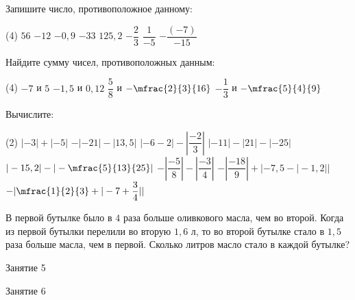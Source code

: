 \begin{homework}[number=2]
	\begin{listofex}
		\item Запишите число, противоположное данному:
		\begin{tasks}(4)
			\task \( 56  \)
			\task \( -12 \)
			\task \( -0,9 \)
			\task \( -33 \)
			\task \( 125,2 \)
			\task \( -\dfrac{2}{3} \)
			\task \( \dfrac{1}{-5} \)
			\task \( -\dfrac{(-7)}{-15} \)
		\end{tasks}
		\item Найдите сумму чисел, противоположных данным:
		\begin{tasks}(4)
			\task \( -7  \) и \( 5 \)
			\task \( -1,5  \) и \( 0,12 \)
			\task \( \dfrac{5}{8}  \) и \( -\mfrac{2}{3}{16} \)
			\task \( -\dfrac{1}{3}  \) и \( -\mfrac{5}{4}{9} \)
		\end{tasks}
		\item Вычислите:
		\begin{tasks}(2)
			\task \(  |-3|+|-5| \)
			\task \(  -|-21|-|13,5| \)
			\task \( |-6-2| - |\dfrac{-2}{3}|  \)
			\task \( |-11|-|21|-|-25|  \)
			\task \(  |-15,2|-|-\mfrac{5}{13}{25}| \)
			\task \(  -|\dfrac{-5}{8}|-|\dfrac{-3}{4}| \)
			\task \(  -|\dfrac{-18}{9}| + |-7,5-|-1,2|| \)
			\task \(  -|\mfrac{1}{2}{3} + |-7+\dfrac{3}{4}|| \)
		\end{tasks}
		
		\item В первой бутылке было в \(4\) раза больше оливкового масла, чем во второй. Когда из первой бутылки перелили во вторую \(1,6\) л, то во второй бутылке стало в \(1,5\) раза больше масла, чем в первой. Сколько литров масло стало в каждой бутылке?
	\end{listofex}
\end{homework}

\begin{class}[number=5]
	\begin{listofex}
		\item Занятие 5
	\end{listofex}
\end{class}

\begin{class}[number=6]
	\begin{listofex}
		\item Занятие 6
	\end{listofex}
\end{class}

